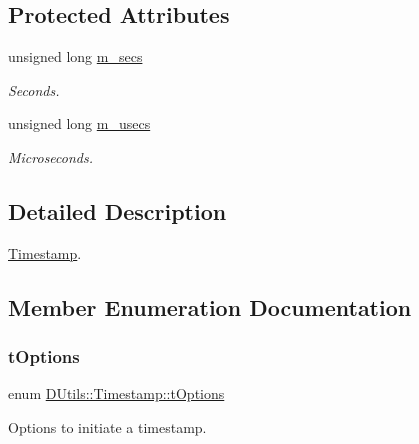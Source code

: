 \subsection*{Protected Attributes}
\begin{DoxyCompactItemize}
\item 
unsigned long \mbox{\hyperlink{class_d_utils_1_1_timestamp_a88b8dff916bb011ef4142ca5cc655425}{m\+\_\+secs}}
\begin{DoxyCompactList}\small\item\em Seconds. \end{DoxyCompactList}\item 
unsigned long \mbox{\hyperlink{class_d_utils_1_1_timestamp_afb8947a2cf3b04919f782f4490ca0935}{m\+\_\+usecs}}
\begin{DoxyCompactList}\small\item\em Microseconds. \end{DoxyCompactList}\end{DoxyCompactItemize}


\subsection{Detailed Description}
\mbox{\hyperlink{class_d_utils_1_1_timestamp}{Timestamp}}. 

\subsection{Member Enumeration Documentation}
\mbox{\label{class_d_utils_1_1_timestamp_a5a8a3cb7f9e0f73bf11fce42688b06c8}} 
\subsubsection{\texorpdfstring{t\+Options}{tOptions}}
{\footnotesize\ttfamily enum \mbox{\hyperlink{class_d_utils_1_1_timestamp_a5a8a3cb7f9e0f73bf11fce42688b06c8}{D\+Utils\+::\+Timestamp\+::t\+Options}}}



Options to initiate a timestamp. 

